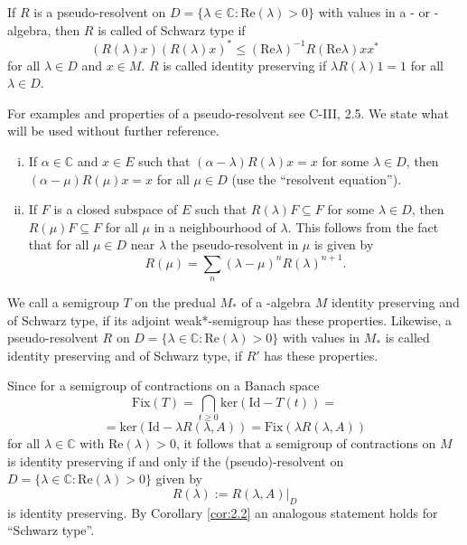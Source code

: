 
If $ R $ is a pseudo-resolvent on $ D = \{\lambda \in \mathbb{C} : \text{Re}(\lambda) > 0\} $ with values in a \CA- or \WA-algebra, then $ R $ is called of Schwarz type if
\[
(R(\lambda)x)(R(\lambda)x)^{*} \leq (\text{Re}\lambda)^{-1} R(\text{Re}\lambda)xx^{*}
\]
for all $ \lambda \in D $ and $ x \in M $.
$ R $ is called identity preserving if $ \lambda R(\lambda)1 = 1 $ for all $ \lambda \in D $.

For examples and properties of a pseudo-resolvent see C-III, 2.5.
We state what will be used without further reference.

\begin{enumerate}[(i)]
\item 
If $ \alpha \in \mathbb{C} $ and $ x \in E $ such that $ (\alpha - \lambda)R(\lambda)x = x $ for some $ \lambda \in D $, then $ (\alpha - \mu)R(\mu)x = x $ for all $ \mu \in D $ (use the \enquote{resolvent equation}).

\item 
If $ F $ is a closed subspace of $ E $ such that $ R(\lambda)F \subseteq F $ for some $ \lambda \in D $, then $ R(\mu)F \subseteq F $ for all $ \mu $ in a neighbourhood of $ \lambda $.
This follows from the fact that for all $ \mu \in D $ near $ \lambda $ the pseudo-resolvent in $ \mu $ is given by
\[
R(\mu) = \sum_{n} (\lambda - \mu)^{n} R(\lambda)^{n+1}.
\]
\end{enumerate}

\begin{definition}\label{def:d1-2.4}
We call a semigroup $ T $ on the predual $ M_{*} $ of a \WA-algebra $ M $ identity preserving and of Schwarz type, if its adjoint weak*-semigroup has these properties.
Likewise, a pseudo-resolvent $ R $ on $ D = \{\lambda \in \mathbb{C} : \text{Re}(\lambda) > 0\} $ with values in $ M_{*} $ is called identity preserving and of Schwarz type, if $ R' $ has these properties.
\end{definition}

Since for a semigroup of contractions on a Banach space
\[
\text{Fix}(T) = \bigcap_{t \geq 0} \text{ker}(\text{Id} - T(t)) =
\]
\[
= \text{ker}(\text{Id} - \lambda R(\lambda,A)) = \text{Fix}(\lambda R(\lambda,A))
\]
for all $ \lambda \in \mathbb{C} $ with $ \text{Re}(\lambda) > 0 $, it follows that a semigroup of contractions on $ M $ is identity preserving if and only if the (pseudo)-resolvent on $ D = \{\lambda \in \mathbb{C} : \text{Re}(\lambda) > 0\} $ given by
\[
R(\lambda) := R(\lambda,A)|_{D}
\]
is identity preserving.
By Corollary \ref{cor:2.2} an analogous statement holds for \enquote{Schwarz type}.

